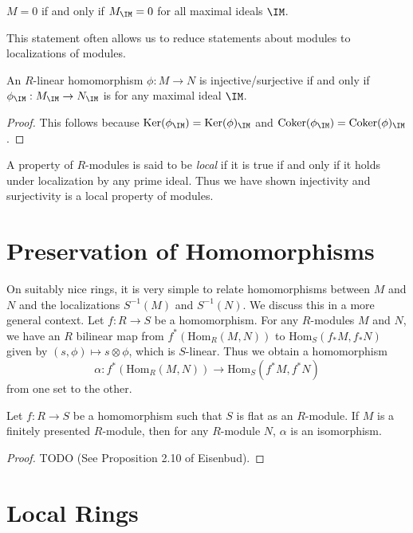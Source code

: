 \begin{corollary}
    $M = 0$ if and only if $M_{\IM} = 0$ for all maximal ideals $\IM$.
\end{corollary}

This statement often allows us to reduce statements about modules to localizations of modules.

\begin{corollary}
    An $R$-linear homomorphism $\phi: M \to N$ is injective/surjective if and only if $\phi_{\IM}: M_{\IM} \to N_{\IM}$ is for any maximal ideal $\IM$.
\end{corollary}
\begin{proof}
    This follows because $\text{Ker}(\phi_{\IM}) = \text{Ker}(\phi)_{\IM}$ and $\text{Coker}(\phi_{\IM}) = \text{Coker}(\phi)_{\IM}$.
\end{proof}

A property of $R$-modules is said to be \emph{local} if it is true if and only if it holds under localization by any prime ideal. Thus we have shown injectivity and surjectivity is a local property of modules.

\section{Preservation of Homomorphisms}

On suitably nice rings, it is very simple to relate homomorphisms between $M$ and $N$ and the localizations $S^{-1}(M)$ and $S^{-1}(N)$. We discuss this in a more general context. Let $f: R \to S$ be a homomorphism. For any $R$-modules $M$ and $N$, we have an $R$ bilinear map from $f^*(\text{Hom}_R(M,N))$ to $\text{Hom}_S(f_* M, f_* N)$ given by $(s,\phi) \mapsto s \otimes \phi$, which is $S$-linear. Thus we obtain a homomorphism
%
\[ \alpha: f^*(\text{Hom}_R(M,N)) \to \text{Hom}_S(f^*M, f^*N) \]
%
from one set to the other.

\begin{theorem}
    Let $f: R \to S$ be a homomorphism such that $S$ is flat as an $R$-module. If $M$ is a finitely presented $R$-module, then for any $R$-module $N$, $\alpha$ is an isomorphism.
\end{theorem}
\begin{proof}
    TODO (See Proposition 2.10 of Eisenbud).
\end{proof}






\section{Local Rings}

